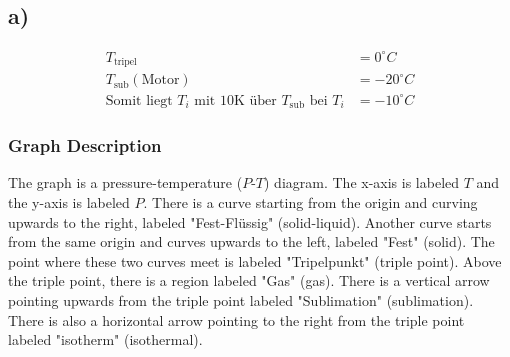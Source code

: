 

\subsection*{a)}

\begin{align*}
    T_{\text{tripel}} &= 0^\circ C \\
    T_{\text{sub}} (\text{Motor}) &= -20^\circ C \\
    \text{Somit liegt } T_i \text{ mit 10K über } T_{\text{sub}} \text{ bei } T_i &= -10^\circ C
\end{align*}

\subsubsection*{Graph Description}

The graph is a pressure-temperature ($P$-$T$) diagram. The x-axis is labeled $T$ and the y-axis is labeled $P$. There is a curve starting from the origin and curving upwards to the right, labeled "Fest-Flüssig" (solid-liquid). Another curve starts from the same origin and curves upwards to the left, labeled "Fest" (solid). The point where these two curves meet is labeled "Tripelpunkt" (triple point). Above the triple point, there is a region labeled "Gas" (gas). There is a vertical arrow pointing upwards from the triple point labeled "Sublimation" (sublimation). There is also a horizontal arrow pointing to the right from the triple point labeled "isotherm" (isothermal).